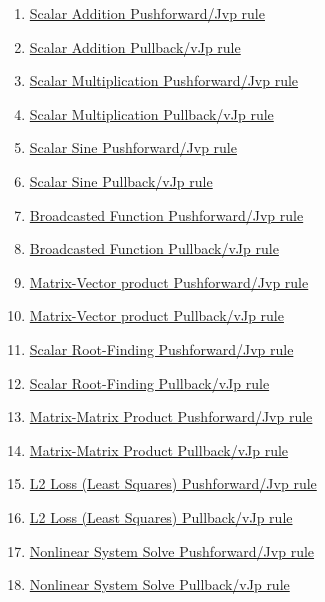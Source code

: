 \documentclass[11pt]{article}
\begin{document}
\begin{enumerate}
	\item \href{https://mp.weixin.qq.com/s/zAXUXuUPENr9AATsQGmXxA}{Scalar Addition Pushforward/Jvp rule}  %
	\item \href{https://mp.weixin.qq.com/s/95G-WZAO4Au1-tIogQsscg}{Scalar Addition Pullback/vJp rule}	%
	\item \href{https://mp.weixin.qq.com/s/EE6QrhBW3xfDi-C9gd9dIw}{Scalar Multiplication Pushforward/Jvp rule}	%
	\item \href{https://mp.weixin.qq.com/s/5J2X2P_dxtd-KMNhDNnBrw}{Scalar Multiplication Pullback/vJp rule}	%
	\item \href{https://mp.weixin.qq.com/s/sB7nyHkkRjWZcToZvw269Q}{Scalar Sine Pushforward/Jvp rule}	%
	\item \href{https://mp.weixin.qq.com/s/ndSUaAxx-MVTtQwGNT41Ng}{Scalar Sine Pullback/vJp rule}	%
	\item \href{https://mp.weixin.qq.com/s/yVEbDhwzoMJD0yZXUMfE8A}{Broadcasted Function Pushforward/Jvp rule}	%
	\item \href{https://mp.weixin.qq.com/s/vXBt5TpDnWg-B8CNxo45Ug}{Broadcasted Function Pullback/vJp rule}	%
	\item \href{https://mp.weixin.qq.com/s/GarjBBLsQZv7OAteDaDMcA}{Matrix-Vector product Pushforward/Jvp rule}	%
	\item \href{https://mp.weixin.qq.com/s/F9r5kLT4tP1x0CeMIraCPA}{Matrix-Vector product Pullback/vJp rule}	%
	\item \href{https://mp.weixin.qq.com/s/Sg-7lksCJkDcLVFr7b_cfw}{Scalar Root-Finding Pushforward/Jvp rule}	%
	\item \href{https://mp.weixin.qq.com/s/GKhK5LcLc-g6GuyeEw_HhQ}{Scalar Root-Finding Pullback/vJp rule}	%
	\item \href{https://mp.weixin.qq.com/s/LPwu-jiIveb2uu6Hi8ANFw}{Matrix-Matrix Product Pushforward/Jvp rule}	%
	\item \href{https://mp.weixin.qq.com/s/9l4fVmT3ktAhW-nmLCiVSg}{Matrix-Matrix Product Pullback/vJp rule}	%
	\item \href{https://mp.weixin.qq.com/s/sGDY9K1mVxvlxyQz0hHtvA}{L2 Loss (Least Squares) Pushforward/Jvp rule}	%
	\item \href{https://mp.weixin.qq.com/s/XSHdAPAzzzhjrWFoYYwQew}{L2 Loss (Least Squares) Pullback/vJp rule}	%
	\item \href{https://mp.weixin.qq.com/s/jRzc_842J8ok7Ds1SYb0jA}{Nonlinear System Solve Pushforward/Jvp rule}	%
	\item \href{https://mp.weixin.qq.com/s/A9tB6x0DAMyP1ikC7ti4Ew}{Nonlinear System Solve Pullback/vJp rule}	%

\end{enumerate}
\end{document}
